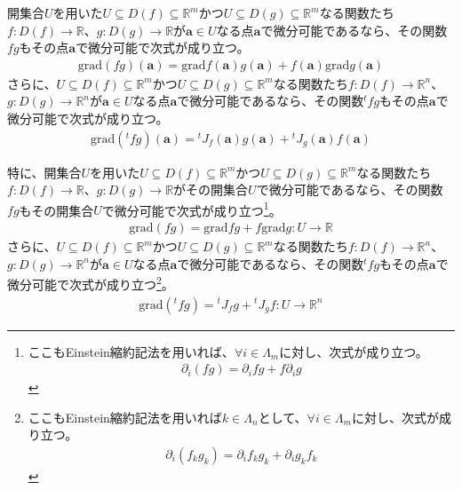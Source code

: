 \documentclass[dvipdfmx]{jsarticle}
\begin{document}
\begin{thm}\label{4.2.6.10}
開集合$U$を用いた$U \subseteq D(f) \subseteq \mathbb{R}^{m}$かつ$U \subseteq D(g) \subseteq \mathbb{R}^{m}$なる関数たち$f:D(f) \rightarrow \mathbb{R}$、$g:D(g) \rightarrow \mathbb{R}$が$\mathbf{a} \in Uなる点\mathbf{a}$で微分可能であるなら、その関数$fg$もその点$\mathbf{a}$で微分可能で次式が成り立つ。
\begin{align*}
\mathrm{grad}(fg)\left( \mathbf{a} \right) = \mathrm{grad}f\left( \mathbf{a} \right)g\left( \mathbf{a} \right) + f\left( \mathbf{a} \right)\mathrm{grad}g\left( \mathbf{a} \right)
\end{align*}
さらに、$U \subseteq D(f) \subseteq \mathbb{R}^{m}$かつ$U \subseteq D(g) \subseteq \mathbb{R}^{m}$なる関数たち$f:D(f) \rightarrow \mathbb{R}^{n}$、$g:D(g) \rightarrow \mathbb{R}^{n}$が$\mathbf{a} \in Uなる点\mathbf{a}$で微分可能であるなら、その関数${}^{t}fg$もその点$\mathbf{a}$で微分可能で次式が成り立つ。
\begin{align*}
\mathrm{grad}\left({}^{t}fg \right)\left( \mathbf{a} \right) ={}^{t}J_{f}\left( \mathbf{a} \right)g\left( \mathbf{a} \right) +{}^{t}J_{g}\left( \mathbf{a} \right)f\left( \mathbf{a} \right)
\end{align*}\par
特に、開集合$U$を用いた$U \subseteq D(f) \subseteq \mathbb{R}^{m}$かつ$U \subseteq D(g) \subseteq \mathbb{R}^{m}$なる関数たち$f:D(f) \rightarrow \mathbb{R}$、$g:D(g) \rightarrow \mathbb{R}$がその開集合$U$で微分可能であるなら、その関数$fg$もその開集合$U$で微分可能で次式が成り立つ\footnote{ここもEinstein縮約記法を用いれば、$\forall i\in \varLambda_{m}$に対し、次式が成り立つ。
\begin{align*}
\partial_{i}\left( fg \right) = \partial_{i} fg+f\partial_{i} g
\end{align*}}。
\begin{align*}
\mathrm{grad}(fg) = \mathrm{grad}fg + f\mathrm{grad}g:U \rightarrow \mathbb{R}
\end{align*}
さらに、$U \subseteq D(f) \subseteq \mathbb{R}^{m}$かつ$U \subseteq D(g) \subseteq \mathbb{R}^{m}$なる関数たち$f:D(f) \rightarrow \mathbb{R}^{n}$、$g:D(g) \rightarrow \mathbb{R}^{n}$が$\mathbf{a} \in Uなる点\mathbf{a}$で微分可能であるなら、その関数${}^{t}fg$もその点$\mathbf{a}$で微分可能で次式が成り立つ\footnote{ここもEinstein縮約記法を用いれば$k \in \varLambda_{n}$として、$\forall i\in \varLambda_{m}$に対し、次式が成り立つ。
\begin{align*}
\partial_{i}\left( f_k g_k \right) = \partial_i f_k g_k +\partial_i g_k f_k 
\end{align*}}。
\begin{align*}
\mathrm{grad}\left({}^{t}fg \right) ={}^{t}J_{f}g +{}^{t}J_{g}f:U \rightarrow \mathbb{R}^{n}
\end{align*}
\end{thm}
\end{document}
